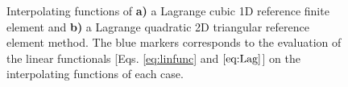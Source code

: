      \begin{figure}[h!]
         \centering
         \def\svgwidth{.9\textwidth} \scriptsize
        \caption[Example of interpolating functions for 1D and 2D finite element]{Interpolating functions of \textbf{a)} a Lagrange cubic 1D reference finite element and \textbf{b)} a Lagrange quadratic 2D triangular reference element method. The blue markers corresponds to the evaluation of the linear functionals [Eqs. \eqref{eq:linfunc} and $\eqref{eq:Lag}$] on the interpolating functions of each case.}
     \label{fig:ExampleElements}
     \end{figure}
